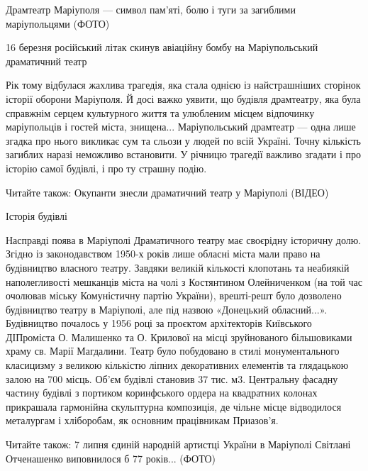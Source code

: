  
 
 
 
 

Драмтеатр Маріуполя — символ пам'яті, болю і туги за загиблими маріупольцями
(ФОТО)

16 березня російський літак скинув авіаційну бомбу на Маріупольський
драматичний театр

Рік тому відбулася жахлива трагедія, яка стала однією із найстрашніших сторінок
історії оборони Маріуполя. Й досі важко уявити, що будівля драмтеатру, яка була
справжнім серцем культурного життя та улюбленим місцем відпочинку маріупольців
і гостей міста, знищена... Маріупольський драмтеатр — одна лише згадка про
нього викликає сум та сльози у людей по всій Україні. Точну кількість загиблих
наразі неможливо встановити. У річницю трагедії важливо згадати і про історію
самої будівлі, і про ту страшну подію.

Читайте також: Окупанти знесли драматичний театр у Маріуполі (ВІДЕО)

Історія будівлі 

Насправді поява в Маріуполі Драматичного театру має своєрідну історичну долю.
Згідно із законодавством 1950-х років лише обласні міста мали право на
будівництво власного театру. Завдяки великій кількості клопотань та неабиякій
наполегливості мешканців міста на чолі з Костянтином Олейниченком (на той час
очолював міську Комуністичну партію України), врешті-решт було дозволено
будівництво театру в Маріуполі, але під назвою «Донецький обласний...».
Будівництво почалось у 1956 році за проєктом архітекторів Київського ДІПроміста
О. Малишенко та О. Крилової на місці зруйнованого більшовиками храму св. Марії
Магдалини. Театр було побудовано в стилі монументального класицизму з великою
кількістю ліпних декоративних елементів та глядацькою залою на 700 місць. Об'єм
будівлі становив 37 тис. м3. Центральну фасадну частину будівлі з портиком
коринфського ордера на квадратних колонах прикрашала гармонійна скульптурна
композиція, де чільне місце відводилося металургам і хліборобам, як основним
працівникам Приазов'я.

Читайте також: 7 липня єдиній народній артистці України в Маріуполі Світлані
Отченашенко виповнилося б 77 років... (ФОТО)


